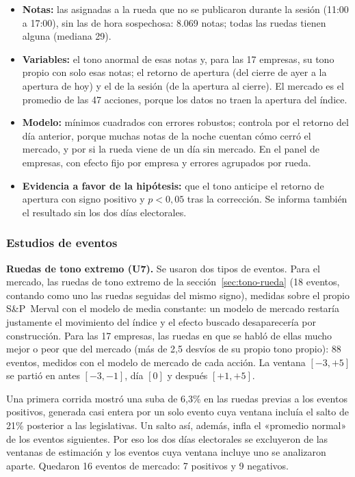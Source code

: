 \begin{itemize}
  \item \textbf{Notas:} las asignadas a la rueda que no se publicaron durante la sesión
        (11:00 a 17:00), sin las de hora sospechosa: 8.069 notas; todas las ruedas tienen
        alguna (mediana 29).
  \item \textbf{Variables:} el tono anormal de esas notas y, para las 17 empresas, su tono
        propio con solo esas notas; el retorno de apertura (del cierre de ayer a la apertura de
        hoy) y el de la sesión (de la apertura al cierre). El mercado es el promedio de las 47
        acciones, porque los datos no traen la apertura del índice.
  \item \textbf{Modelo:} mínimos cuadrados con errores robustos; controla por el retorno del
        día anterior, porque muchas notas de la noche cuentan cómo cerró el mercado, y por si
        la rueda viene de un día sin mercado. En el panel de empresas, con efecto fijo por
        empresa y errores agrupados por rueda.
  \item \textbf{Evidencia a favor de la hipótesis:} que el tono anticipe el retorno de
        apertura con signo positivo y $p<0{,}05$ tras la corrección. Se informa también el
        resultado sin los dos días electorales.
\end{itemize}

\subsubsection{Estudios de eventos}

\textbf{Ruedas de tono extremo (U7).} Se usaron dos tipos de eventos. Para el mercado, las
ruedas de tono extremo de la sección~\ref{sec:tono-rueda} (18 eventos, contando como uno las
ruedas seguidas del mismo signo), medidas sobre el propio S\&P~Merval con el modelo de media
constante: un modelo de mercado restaría justamente el movimiento del índice y el efecto
buscado desaparecería por construcción. Para las 17 empresas, las ruedas en que se habló de
ellas mucho mejor o peor que del mercado (más de 2,5 desvíos de su propio tono propio): 88
eventos, medidos con el modelo de mercado de cada acción. La ventana $[-3,+5]$ se partió en
antes $[-3,-1]$, día $[0]$ y después $[+1,+5]$.

Una primera corrida mostró una suba de 6,3\% en las ruedas previas a los eventos positivos,
generada casi entera por un solo evento cuya ventana incluía el salto de 21\% posterior a las
legislativas. Un salto así, además, infla el «promedio normal» de los eventos siguientes. Por
eso los dos días electorales se excluyeron de las ventanas de estimación y los eventos cuya
ventana incluye uno se analizaron aparte. Quedaron 16 eventos de mercado: 7 positivos y 9
negativos.

